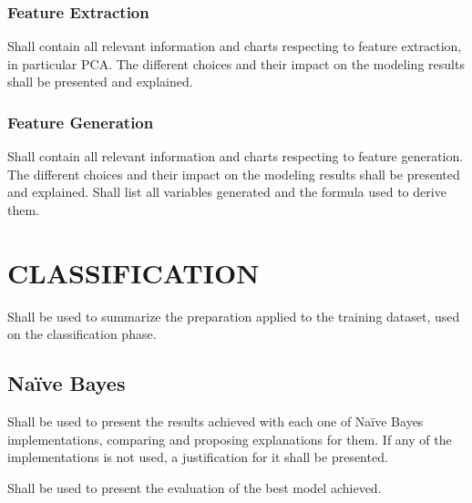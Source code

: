 \documentclass[11pt]{article}
\begin{document}

\subsubsection*{Feature Extraction}
\begin{tcolorbox} %
Shall contain all relevant information and charts respecting to feature extraction, in particular PCA. The different choices and their impact on the modeling results shall be presented and explained. 
\end{tcolorbox} %


\subsubsection*{Feature Generation}
\begin{tcolorbox} %
Shall contain all relevant information and charts respecting to feature generation. The different choices and their impact on the modeling results shall be presented and explained. Shall list all variables generated and the formula used to derive them. 
\end{tcolorbox} %


\section{CLASSIFICATION}
\begin{tcolorbox} %
Shall be used to summarize the preparation applied to the training dataset, used on the classification phase. 
\end{tcolorbox} %


\subsection{Naïve Bayes}
\begin{tcolorbox} %
Shall be used to present the results achieved with each one of Naïve Bayes implementations, comparing and proposing explanations for them. If any of the implementations is not used, a justification for it shall be presented.
\end{tcolorbox} %
\begin{tcolorbox} %
Shall be used to present the evaluation of the best model achieved.
\end{tcolorbox} %
\end{document}
